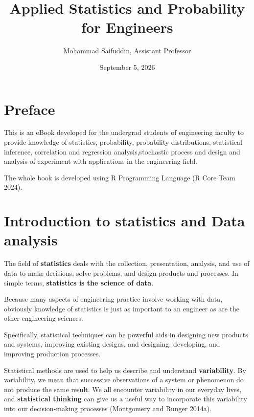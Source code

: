 \documentclass[
  11pt,
  letterpaper,
  DIV=11,
  numbers=noendperiod]{scrreprt}
\title{Applied Statistics and Probability for Engineers}
\author{Mohammad Saifuddin, Assistant Professor}
\date{September 5, 2026}
\renewcommand*\contentsname{Table of contents}
\newcommand\contentsname{Table of contents}
\begin{document}
\maketitle

\renewcommand*\contentsname{Table of contents}
{
\hypersetup{linkcolor=}
\setcounter{tocdepth}{1}
\tableofcontents
}


\chapter*{Preface}\label{preface}


This is an eBook developed for the undergrad students of engineering
faculty to provide knowledge of statistics, probability, probability
distributions, statistical inference, correlation and regression
analysis,stochastic process and design and analysis of experiment with
applications in the engineering field.

The whole book is developed using R Programming Language (R Core Team
2024).


\chapter{Introduction to statistics and Data
analysis}\label{introduction-to-statistics-and-data-analysis}

The field of \textbf{statistics} deals with the collection,
presentation, analysis, and use of data to make decisions, solve
problems, and design products and processes. In simple terms,
\textbf{statistics is the science of data}.

Because many aspects of engineering practice involve working with data,
obviously knowledge of statistics is just as important to an engineer as
are the other engineering sciences.

Specifically, statistical techniques can be powerful aids in designing
new products and systems, improving existing designs, and designing,
developing, and improving production processes.

Statistical methods are used to help us describe and understand
\textbf{variability}. By variability, we mean that successive
observations of a system or phenomenon do not produce the same result.
We all encounter variability in our everyday lives, and
\textbf{statistical thinking} can give us a useful way to incorporate
this variability into our decision-making processes (Montgomery and
Runger 2014a).
\end{document}
